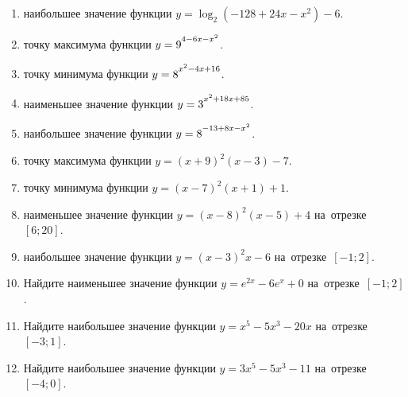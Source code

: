 \documentclass[a4paper,10pt]{article}
\begin{document}
\begin{enumerate}
\item {} наибольшее значение функции $y=\log_2\left(-128+24x-x^2\right)-6$.

\item {} точку максимума функции $y=9\strut^{4-6x-x^2}$.

\item {} точку минимума функции $y=8\strut^{x^2-4x+16}$.

\item {} наименьшее значение функции $y=3\strut^{x^2+18x+85}$.

\item {} наибольшее значение функции $y=8\strut^{-13+8x-x^2}$.

\item {} точку максимума функции $y=\left(x+9\right)^2\left(x-3\right)-7$.

\item {} точку минимума функции $y=\left(x-7\right)^2\left(x+1\right)+1$.

\item {} наименьшее значение функции $y=\left(x-8\right)^2\left(x-5\right)+4$ на~отрезке~$\left[6;20\right]$.

\item {} наибольшее значение функции $y=\left(x-3\right)^2x-6$ на~отрезке~$\left[-1;2\right]$.

\item Найдите наименьшее значение функции $y=e^{2x}-6e^x+0$ на~отрезке~$\left[-1;2\right]$.

\item Найдите наибольшее значение функции $y=x^5-5x^3-20x$ на~отрезке~$\left[-3;1\right]$.

\item Найдите наибольшее значение функции $y=3x^5-5x^3-11$ на~отрезке~$\left[-4;0\right]$.

\end{enumerate}
\end{document}
